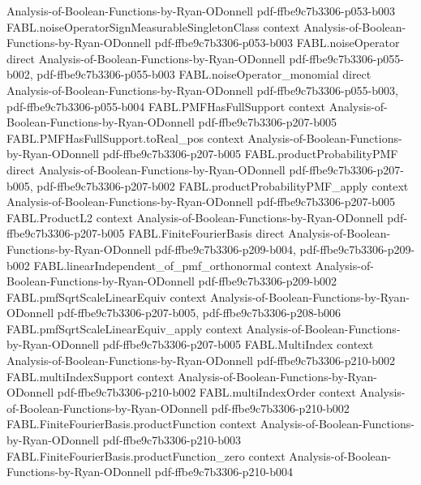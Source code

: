 \begin{theorem}
  {Analysis-of-Boolean-Functions-by-Ryan-ODonnell}
  {pdf-ffbe9c7b3306-p053-b003}
\proofstep
  {FABL.noiseOperatorSignMeasurableSingletonClass}
  {context}
  {Analysis-of-Boolean-Functions-by-Ryan-ODonnell}
  {pdf-ffbe9c7b3306-p053-b003}
\proofstep
  {FABL.noiseOperator}
  {direct}
  {Analysis-of-Boolean-Functions-by-Ryan-ODonnell}
  {pdf-ffbe9c7b3306-p055-b002,
    pdf-ffbe9c7b3306-p055-b003}
\proofstep
  {FABL.noiseOperator_monomial}
  {direct}
  {Analysis-of-Boolean-Functions-by-Ryan-ODonnell}
  {pdf-ffbe9c7b3306-p055-b003,
    pdf-ffbe9c7b3306-p055-b004}
\proofstep
  {FABL.PMFHasFullSupport}
  {context}
  {Analysis-of-Boolean-Functions-by-Ryan-ODonnell}
  {pdf-ffbe9c7b3306-p207-b005}
\proofstep
  {FABL.PMFHasFullSupport.toReal_pos}
  {context}
  {Analysis-of-Boolean-Functions-by-Ryan-ODonnell}
  {pdf-ffbe9c7b3306-p207-b005}
\proofstep
  {FABL.productProbabilityPMF}
  {direct}
  {Analysis-of-Boolean-Functions-by-Ryan-ODonnell}
  {pdf-ffbe9c7b3306-p207-b005,
    pdf-ffbe9c7b3306-p207-b002}
\proofstep
  {FABL.productProbabilityPMF_apply}
  {context}
  {Analysis-of-Boolean-Functions-by-Ryan-ODonnell}
  {pdf-ffbe9c7b3306-p207-b005}
\proofstep
  {FABL.ProductL2}
  {context}
  {Analysis-of-Boolean-Functions-by-Ryan-ODonnell}
  {pdf-ffbe9c7b3306-p207-b005}
\proofstep
  {FABL.FiniteFourierBasis}
  {direct}
  {Analysis-of-Boolean-Functions-by-Ryan-ODonnell}
  {pdf-ffbe9c7b3306-p209-b004,
    pdf-ffbe9c7b3306-p209-b002}
\proofstep
  {FABL.linearIndependent_of_pmf_orthonormal}
  {context}
  {Analysis-of-Boolean-Functions-by-Ryan-ODonnell}
  {pdf-ffbe9c7b3306-p209-b002}
\proofstep
  {FABL.pmfSqrtScaleLinearEquiv}
  {context}
  {Analysis-of-Boolean-Functions-by-Ryan-ODonnell}
  {pdf-ffbe9c7b3306-p207-b005,
    pdf-ffbe9c7b3306-p208-b006}
\proofstep
  {FABL.pmfSqrtScaleLinearEquiv_apply}
  {context}
  {Analysis-of-Boolean-Functions-by-Ryan-ODonnell}
  {pdf-ffbe9c7b3306-p207-b005}
\proofstep
  {FABL.MultiIndex}
  {context}
  {Analysis-of-Boolean-Functions-by-Ryan-ODonnell}
  {pdf-ffbe9c7b3306-p210-b002}
\proofstep
  {FABL.multiIndexSupport}
  {context}
  {Analysis-of-Boolean-Functions-by-Ryan-ODonnell}
  {pdf-ffbe9c7b3306-p210-b002}
\proofstep
  {FABL.multiIndexOrder}
  {context}
  {Analysis-of-Boolean-Functions-by-Ryan-ODonnell}
  {pdf-ffbe9c7b3306-p210-b002}
\proofstep
  {FABL.FiniteFourierBasis.productFunction}
  {context}
  {Analysis-of-Boolean-Functions-by-Ryan-ODonnell}
  {pdf-ffbe9c7b3306-p210-b003}
\proofstep
  {FABL.FiniteFourierBasis.productFunction_zero}
  {context}
  {Analysis-of-Boolean-Functions-by-Ryan-ODonnell}
  {pdf-ffbe9c7b3306-p210-b004}
\proofstep

\end{theorem}
